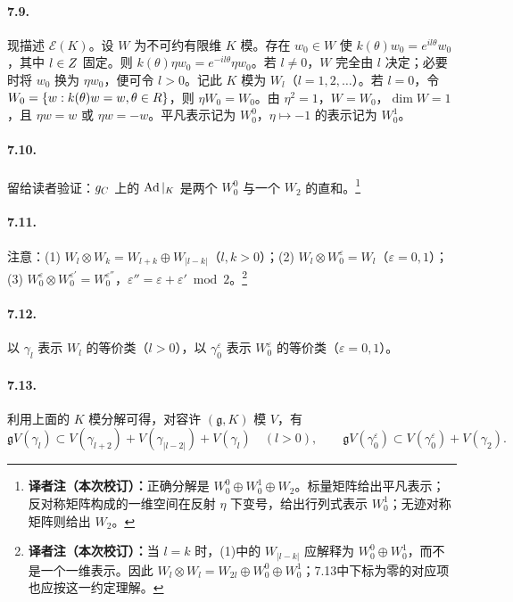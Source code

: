 \paragraph*{7.9.} 现描述 $\mathcal E(K)$。设 $W$ 为不可约有限维 $K$ 模。存在 $w_0\in W$ 使 $k(\theta)w_0=e^{il\theta}w_0$，其中 $l\in Z$ 固定。则 $k(\theta)\eta w_0=e^{-il\theta}\eta w_0$。若 $l\ne0$，$W$ 完全由 $l$ 决定；必要时将 $w_0$ 换为 $\eta w_0$，便可令 $l>0$。记此 $K$ 模为 $W_l$（$l=1,2,\ldots$）。若 $l=0$，令 $W_0=\{w:k(\theta)w=w,\theta\in R\}$，则 $\eta W_0=W_0$。由 $\eta^2=1$，$W=W_0$，$\dim W=1$，且 $\eta w=w$ 或 $\eta w=-w$。平凡表示记为 $W_0^0$，$\eta\mapsto-1$ 的表示记为 $W_0^1$。
\paragraph*{7.10.} 留给读者验证：$g_{C}$ 上的 $\operatorname{Ad}|_K$ 是两个 $W_0^0$ 与一个 $W_2$ 的直和。\footnote{\textbf{译者注（本次校订）：}正确分解是 $W_0^0\oplus W_0^1\oplus W_2$。标量矩阵给出平凡表示；反对称矩阵构成的一维空间在反射 $\eta$ 下变号，给出行列式表示 $W_0^1$；无迹对称矩阵则给出 $W_2$。}
\paragraph*{7.11.} 注意：(1) $W_l\otimes W_k=W_{l+k}\oplus W_{|l-k|}$（$l,k>0$）；(2) $W_l\otimes W_0^\varepsilon=W_l$（$\varepsilon=0,1$）；(3) $W_0^\varepsilon\otimes W_0^{\varepsilon'}=W_0^{\varepsilon''}$，$\varepsilon''=\varepsilon+\varepsilon'\bmod2$。\footnote{\textbf{译者注（本次校订）：}当 $l=k$ 时，(1)中的 $W_{|l-k|}$ 应解释为 $W_0^0\oplus W_0^1$，而不是一个一维表示。因此 $W_l\otimes W_l=W_{2l}\oplus W_0^0\oplus W_0^1$；7.13中下标为零的对应项也应按这一约定理解。}
\paragraph*{7.12.} 以 $\gamma_l$ 表示 $W_l$ 的等价类（$l>0$），以 $\gamma_0^\varepsilon$ 表示 $W_0^\varepsilon$ 的等价类（$\varepsilon=0,1$）。
\paragraph*{7.13.} 利用上面的 $K$ 模分解可得，对容许 $(\mathfrak g,K)$ 模 $V$，有
\[
 \mathfrak g V(\gamma_l)\subset V(\gamma_{l+2})+V(\gamma_{|l-2|})+V(\gamma_l)\quad(l>0),
 \qquad
 \mathfrak g V(\gamma_0^\varepsilon)\subset V(\gamma_0^\varepsilon)+V(\gamma_2).
\]
